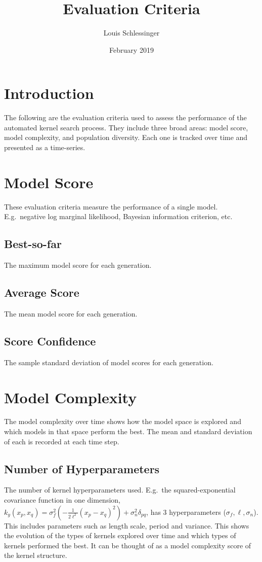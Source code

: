\documentclass{article}
\title{Evaluation Criteria}
\author{Louis Schlessinger}
\date{February 2019}
\begin{document}
\maketitle

\section{Introduction}\label{sec:introduction}

The following are the evaluation criteria used to assess the performance of the automated kernel search process.
They include three broad areas: model score, model complexity, and population diversity.
Each one is tracked over time and presented as a time-series.

\section{Model Score}\label{sec:model-score}
These evaluation criteria measure the performance of a single model.
E.g.\ negative log marginal likelihood, Bayesian information criterion, etc.
\subsection{Best-so-far}\label{subsec:best-so-far}
The maximum model score for each generation.
\subsection{Average Score}\label{subsec:average-score}
The mean model score for each generation.
\subsection{Score Confidence}\label{subsec:score-confidence}
The sample standard deviation of model scores for each generation.
\section{Model Complexity}\label{sec:model-complexity}
The model complexity over time shows how the model space is explored and which models in that space perform the best.
The mean and standard deviation of each is recorded at each time step.
\subsection{Number of Hyperparameters}\label{subsec:number-of-hyperparameters}
The number of kernel hyperparameters used.
E.g.\  the squared-exponential covariance function in one dimension, $k_y(x_p, x_q)=\sigma_{f}^{2}\left(-\frac{1}{2\ell^2}(x_p - x_q)^2\right)+\sigma_{n}^{2}\delta_{pq}$, has 3 hyperparameters ($\sigma_{f}, \ell,\sigma_{n}$).
This includes parameters such as length scale, period and variance.
This shows the evolution of the types of kernels explored over time and which types of kernels performed the best.
It can be thought of as a model complexity score of the kernel structure.
\end{document}
